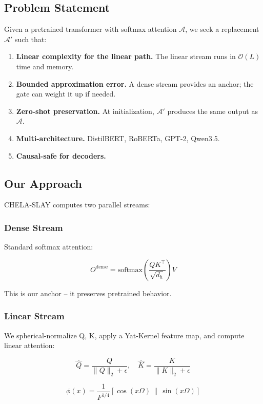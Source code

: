 \subsection{Problem Statement}

Given a pretrained transformer with softmax attention $\mathcal{A}$, we seek 
a replacement $\mathcal{A}'$ such that:

\begin{enumerate}
\item \textbf{Linear complexity for the linear path.} The linear stream runs in
  $\mathcal{O}(L)$ time and memory.
\item \textbf{Bounded approximation error.} A dense stream provides an anchor; the
  gate can weight it up if needed.
\item \textbf{Zero-shot preservation.} At initialization, $\mathcal{A}'$ produces
  the same output as $\mathcal{A}$.
\item \textbf{Multi-architecture.} DistilBERT, RoBERTa, GPT-2, Qwen3.5.
\item \textbf{Causal-safe for decoders.}

\end{enumerate}
\subsection{Our Approach}

CHELA-SLAY computes two parallel streams:

\subsubsection{Dense Stream}

Standard softmax attention:

\[
O^\text{dense} = \text{softmax}\!\left(\frac{Q K^\top}{\sqrt{d_h}}\right) V
\]

This is our anchor -- it preserves pretrained behavior.

\subsubsection{Linear Stream}

We spherical-normalize Q, K, apply a Yat-Kernel feature map, and compute 
linear attention:

\[
\hat{Q} = \frac{Q}{\|Q\|_2 + \epsilon}, \quad
\hat{K} = \frac{K}{\|K\|_2 + \epsilon}
\]

\[
\phi(x) = \frac{1}{F^{1/4}} [\cos(x \Omega) \,\|\, \sin(x \Omega)]
\]

